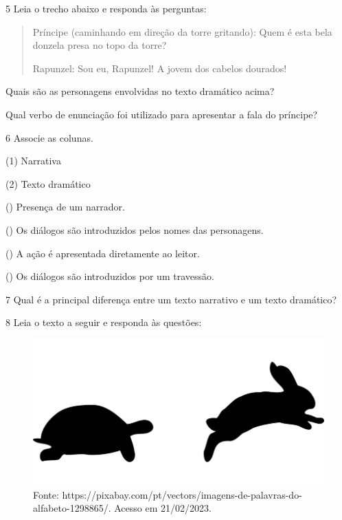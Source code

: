 \num{5} Leia o trecho abaixo e responda às perguntas:

\begin{quote}
Príncipe (caminhando em direção da torre gritando): Quem é esta bela
donzela presa no topo da torre?

Rapunzel: Sou eu, Rapunzel! A jovem dos cabelos dourados!
\end{quote}

\begin{escolha}
\item Quais são as personagens envolvidas no texto dramático acima?



\item Qual verbo de enunciação foi utilizado para apresentar a fala do príncipe?

\end{escolha}

\num{6} Associe as colunas.

\begin{multicols}{2}
(1) Narrativa\medskip

(2) Texto dramático

\columnbreak

() Presença de um narrador.

() Os diálogos são introduzidos pelos nomes das personagens.

() A ação é apresentada diretamente ao leitor.

() Os diálogos são introduzidos por um travessão.
\end{multicols}

\num{7} Qual é a principal diferença entre um texto narrativo e um texto dramático?



\num{8} Leia o texto a seguir e responda às questões:

\begin{figure}[htpb!]
\includegraphics[width=.5\textwidth]{./imgs/img6.jpg}
\caption{Fonte: https://pixabay.com/pt/vectors/imagens-de-palavras-do-alfabeto-1298865/. Acesso em 21/02/2023.}
\end{figure}

